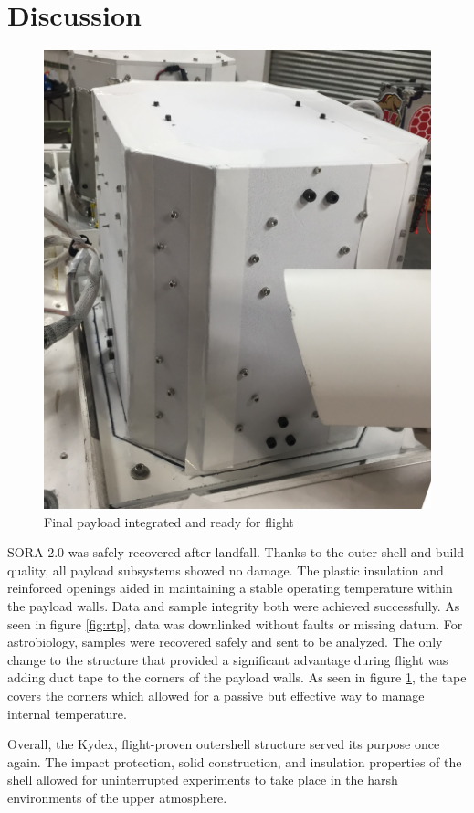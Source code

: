 \section{Discussion}
\label{sec:Discussion}
\begin{figure}[H]
	\begin{center}
		\includegraphics[width=70 mm, scale=1]{figures/payload_integrated.JPG}
		\caption{Final payload integrated and ready for flight}
		\label{fig:payload_int}
	\end{center}
\end{figure}

SORA 2.0 was safely recovered after landfall.  Thanks to the outer shell and build quality, all payload subsystems showed no damage.  
The plastic insulation and reinforced openings aided in maintaining a stable operating temperature within the payload walls.  
Data and sample integrity both were achieved successfully.  As seen in figure \ref{fig:rtp}, data was downlinked without faults or 
missing datum. For astrobiology, samples were recovered safely and sent to be analyzed. The only change to the structure that provided 
a significant advantage during flight was adding duct tape to the corners of the payload walls. 
As seen in figure \ref{fig:payload_int}, the tape covers the corners which allowed for a passive but effective way to manage internal 
temperature.  

Overall, the Kydex, flight-proven outershell structure served its purpose once again.  
The impact protection, solid construction, and insulation properties of the shell allowed for uninterrupted experiments to 
take place in the harsh environments of the upper atmosphere.